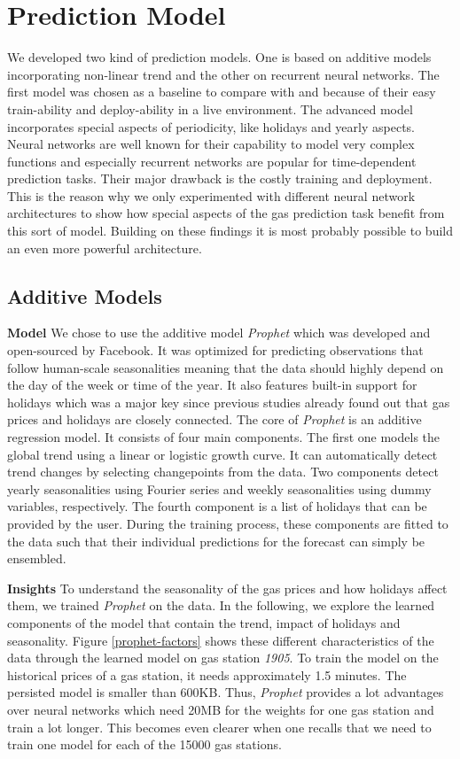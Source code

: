 \documentclass[%
a4paper,
DIV12,
2.5headlines,
bigheadings,
titlepage,
openbib,
]{scrartcl}
\begin{document}
\section{Prediction Model}\label{prediction-model}
We developed two kind of prediction models. 
One is based on additive models incorporating non-linear trend and the other on recurrent neural networks.
The first model was chosen as a baseline to compare with and because of their easy train-ability and deploy-ability in a live environment.
The advanced model incorporates special aspects of periodicity, like holidays and yearly aspects.
Neural networks are well known for their capability to model very complex functions and especially recurrent networks are popular for time-dependent prediction tasks.
Their major drawback is the costly training and deployment.
This is the reason why we only experimented with different neural network architectures to show how special aspects of the gas prediction task benefit from this sort of model.
Building on these findings it is most probably possible to build an even more powerful architecture.

\subsection{Additive Models}\label{additive-models}
\textbf{Model}
We chose to use the additive model \textit{Prophet} which was developed and open-sourced by Facebook\citep{taylor2017forecasting}.
It was optimized for predicting observations that follow human-scale seasonalities meaning that the data should highly depend on the day of the week or time of the year.
It also features built-in support for holidays which was a major key since previous studies already found out that gas prices and holidays are closely connected.
The core of \textit{Prophet} is an additive regression model.
It consists of four main components.
The first one models the global trend using a linear or logistic growth curve.
It can automatically detect trend changes by selecting changepoints from the data.
Two components detect yearly seasonalities using Fourier series and weekly seasonalities using dummy variables, respectively.
The fourth component is a list of holidays that can be provided by the user.
During the training process, these components are fitted to the data such that their individual predictions for the forecast can simply be ensembled.

\textbf{Insights}
To understand the seasonality of the gas prices and how holidays affect them, we trained \textit{Prophet} on the data. 
In the following, we explore the learned components of the model that contain the trend, impact of holidays and seasonality.
Figure \ref{prophet-factors} shows these different characteristics of the data through the learned model on gas station \textit{1905}.
To train the model on the historical prices of a gas station, it needs approximately 1.5 minutes.
The persisted model is smaller than 600KB.
Thus, \textit{Prophet} provides a lot advantages over neural networks which need 20MB for the weights for one gas station and train a lot longer.
This becomes even clearer when one recalls that we need to train one model for each of the 15000 gas stations.
\end{document}
